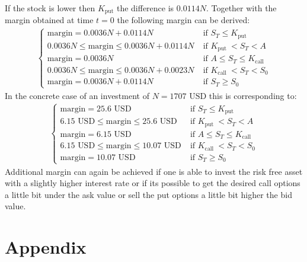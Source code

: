 \documentclass[11pt,oneside,a4paper]{article}
\makeatletter
\def\cleardoublepage{\clearpage\if@twoside \ifodd\c@page\else%
	\hbox{}%
	\thispagestyle{empty}%
	\clearpage%
	\if@twocolumn\hbox{}\clearpage\fi\fi\fi}
\makeatother
\begin{document}
	If the stock is lower then $ K_{\text{put}} $ the difference is $ 0.0114N $. 
	Together with the margin obtained at time $ t=0 $ the following margin can be derived:
	\begin{align*}
		 \begin{cases}
		 \text{margin} = 0.0036N + 0.0114N \; &\text{if } S_T \leq K_\text{put} \\
		  0.0036N \leq \text{margin} \leq 0.0036N + 0.0114N  \; &\text{if } K_\text{put }<S_T < A \\
		   \text{margin} = 0.0036N  \; &\text{if } A \leq S_T \leq K_\text{call} \\
		   0.0036N \leq \text{margin} \leq 0.0036N + 0.0023N  \; &\text{if } K_\text{call }<S_T < S_0 \\
		 \text{margin} = 0.0036N + 0.0114N \; &\text{if } S_T \geq S_0
		 \end{cases}
	\end{align*}
	In the concrete case of an investment of $ N = 1707 \text{ USD} $ this is corresponding to:
	\begin{align*}
	\begin{cases}
	\text{margin} = 25.6 \text{ USD} \; &\text{if } S_T \leq K_\text{put} \\
	6.15 \text{ USD} \leq \text{margin} \leq 25.6 \text{ USD}  \; &\text{if } K_\text{put }<S_T < A \\
	\text{margin} = 6.15 \text{ USD}  \; &\text{if } A \leq S_T \leq K_\text{call} \\
	6.15 \text{ USD} \leq \text{margin} \leq 10.07 \text{ USD}  \; &\text{if } K_\text{call }<S_T < S_0 \\
	\text{margin} =  10.07 \text{ USD} \; &\text{if } S_T \geq S_0
	\end{cases}
	\end{align*}
	Additional margin can again be achieved if one is able to invest the risk free asset with a slightly higher interest rate or if its possible to get the desired call options a little bit under the ask value or sell the put options a little bit higher the bid value.
	
	
	
	\cleardoublepage
	\section{Appendix}
\end{document}
